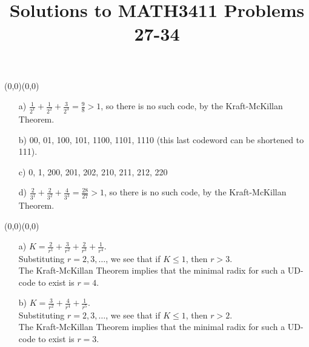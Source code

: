 \documentclass[11pt]{article}
\date{}
\author{}
\title{\sc Solutions to MATH3411 Problems 27-34}
\newcommand{\moveup}{\begin{picture}(0,0)(0,0)\end{picture}\vspace*{-8.15mm}}
\begin{document}
 \maketitle

\vspace*{-10mm}

\moveup
\begin{itemize}
  \item[{a)}] $\frac{1}{2^1}+\frac{1}{2^2}+\frac{3}{2^3} = \frac{9}{8} > 1$, so there is no such code, by the Kraft-McKillan Theorem.
  \item[{b)}] 00, 01, 100, 101, 1100, 1101, 1110 (this last codeword can be shortened to 111).
  \item[{c)}] 0, 1, 200, 201, 202, 210, 211, 212, 220
  \item[{d)}] $\frac{2}{3^1}+\frac{2}{3^2}+\frac{4}{3^3} = \frac{28}{27} > 1$,
      so there is no such code, by the Kraft-McKillan Theorem.
\end{itemize}

\bigskip
{} \moveup
\begin{itemize}
  \item[{a)}] $K = \frac{2}{r^1} + \frac{3}{r^2}+\frac{2}{r^3} + \frac{1}{r^4}$.\\
     Substituting $r= 2,3,\ldots$, we see that if $K \leq 1$, then $r > 3$.\\
     The Kraft-McKillan Theorem implies that the minimal radix for such a UD-code to
     exist is $r = 4$.
  \item[{b)}] $K = \frac{3}{r^2} + \frac{4}{r^4}+\frac{1}{r^5}$.\\
     Substituting $r= 2,3,\ldots$, we see that if $K \leq 1$, then $r > 2$.\\
     The Kraft-McKillan Theorem implies that the minimal radix for such a UD-code to
     exist is $r = 3$.
  \end{itemize}
\end{document}
